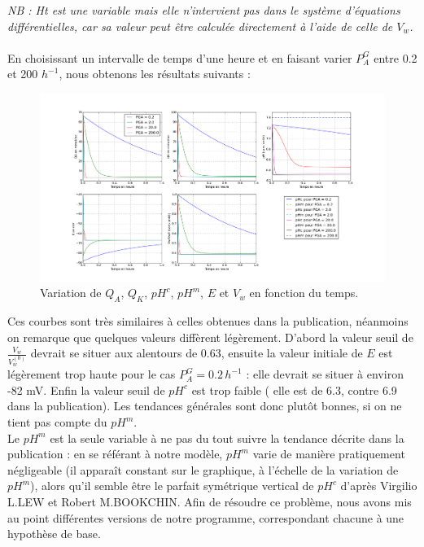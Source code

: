 \documentclass[a4paper,fleqn]{article}
\begin{document}
\textit{NB : Ht est une variable mais elle n'intervient pas dans le système d'équations différentielles, car sa valeur peut être calculée directement à l'aide de celle de $V_w$.}\\
\\

En choisissant un intervalle de temps d'une heure et en faisant varier $P_{A}^{G}$ entre 0.2 et 200 $h^{-1}$, nous obtenons les résultats suivants :

\begin{figure}[H]
\centering 
\includegraphics[width=1.1\textwidth]{original_hum.png}
\caption{Variation de $Q_{A}$, $Q_{K}$, $pH^{c}$, $pH^{m}$, $E$ et $V_{w}$ en fonction du temps.}
\end{figure} 

Ces courbes sont très similaires à celles obtenues dans la publication, néanmoins on remarque que quelques valeurs diffèrent légèrement. D'abord la valeur seuil de $\frac{V_w}{V_w^{(0)}}$ devrait se situer aux alentours de 0.63, ensuite la valeur initiale de $E$ est légèrement trop haute pour le cas $P_{A}^{G} = 0.2\,h^{-1}$ : elle devrait se situer à environ -82 mV. Enfin la valeur seuil de $pH^c$ est trop faible ( elle est de 6.3, contre 6.9 dans la publication). Les tendances générales sont donc plutôt bonnes, si on ne tient pas compte du $pH^m$.\\

Le $pH^m$ est la seule variable à ne pas du tout suivre la tendance décrite dans la publication : en se référant à notre modèle, $pH^m$ varie de manière pratiquement négligeable (il apparaît constant sur le graphique, à l'échelle de la variation de $pH^m$), alors qu'il semble être le parfait symétrique vertical de $pH^c$ d'après Virgilio L.LEW et Robert M.BOOKCHIN. Afin de résoudre ce problème, nous avons mis au point différentes versions de notre programme, correspondant chacune à une hypothèse de base.
\end{document}
